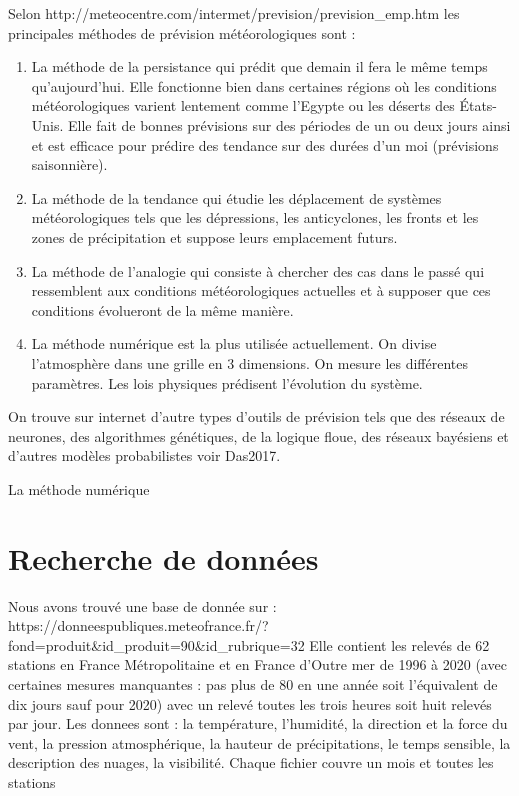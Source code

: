 \documentclass[11pt,a4paper]{article}
\begin{document}
Selon http://meteocentre.com/intermet/prevision/prevision\_emp.htm
les principales méthodes de prévision météorologiques sont :
\begin{enumerate}
\item La méthode de la persistance qui prédit que demain il fera le même temps qu'aujourd'hui. Elle fonctionne bien dans certaines régions où les conditions météorologiques varient lentement comme	l'Egypte ou les déserts des États-Unis. Elle fait de bonnes prévisions sur des périodes de un ou deux jours ainsi et est efficace pour prédire des tendance sur des durées d'un moi (prévisions saisonnière). 
\item La méthode de la tendance qui étudie les déplacement de systèmes météorologiques tels que les dépressions, les anticyclones, les fronts et les zones de précipitation et suppose leurs emplacement futurs.
\item La méthode de l'analogie qui consiste à chercher des cas dans le passé qui ressemblent aux conditions météorologiques actuelles et à supposer que ces conditions évolueront de la même manière.
\item La méthode numérique est la plus utilisée actuellement. On divise l'atmosphère dans une grille en 3 dimensions. On mesure les différentes paramètres. Les lois physiques prédisent l'évolution du système.
\end{enumerate}

On trouve sur internet d'autre types d'outils de prévision tels que des réseaux de neurones, des algorithmes génétiques, de la logique floue, des réseaux bayésiens et d'autres modèles probabilistes voir Das2017.

La méthode numérique 

\section{Recherche de données}

Nous avons trouvé une base de donnée sur  : \\
https://donneespubliques.meteofrance.fr/?fond=produit\&id\_produit=90\&id\_rubrique=32
Elle contient les relevés de 62 stations en France Métropolitaine et en France d’Outre mer
de 1996 à 2020  (avec certaines mesures manquantes : pas plus de 80 en une année soit l'équivalent de dix jours sauf pour 2020)
avec un relevé toutes les trois heures soit huit relevés par jour.
Les donnees sont : la température, l'humidité, la direction et la force du vent, la pression atmosphérique, la hauteur de précipitations, le temps sensible, la description des nuages, la visibilité.
Chaque fichier couvre un mois et toutes les stations
\end{document}
